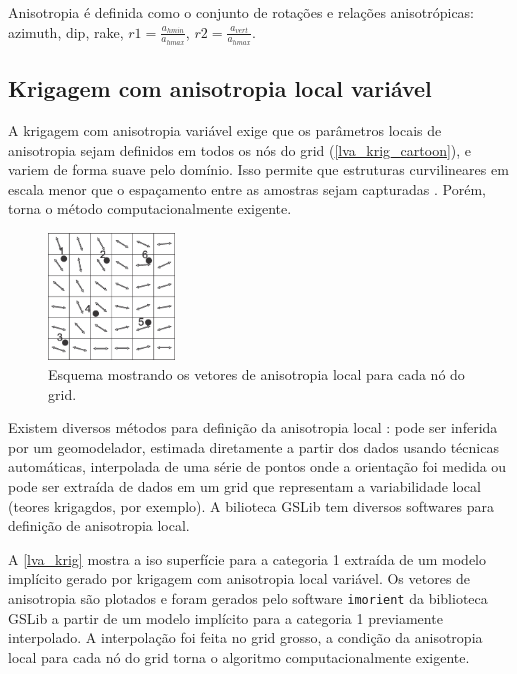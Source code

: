 Anisotropia é definida como o conjunto de rotações e relações anisotrópicas: azimuth, dip, rake, $r1 = \frac{a_{hmin}}{a_{hmax}}$, $r2 = \frac{a_{vert}}{a_{hmax}}$. 

\subsection{Krigagem com anisotropia local variável}

A krigagem com anisotropia variável exige que os parâmetros locais de anisotropia sejam definidos em todos os nós do grid (\autoref{lva_krig_cartoon}), e variem de forma suave pelo domínio. Isso permite que estruturas curvilineares em escala menor que o espaçamento entre as amostras sejam capturadas \cite{martin2017implicitmodeling}. Porém, torna o método computacionalmente exigente.

\begin{figure}[!ht]
\caption{\label{lva_krig_cartoon}Esquema mostrando os vetores de anisotropia local para cada nó do grid.}
	\begin{center}
		\includegraphics[width=0.3\textwidth]{capitulo_2/lvakrig.jpg}
	\end{center}
\end{figure}

Existem diversos métodos para definição da anisotropia local \cite{lillah2015inference}: pode ser inferida por um geomodelador, estimada diretamente a partir dos dados usando técnicas automáticas, interpolada de uma série de pontos onde a orientação foi medida ou pode ser extraída de dados em um grid que representam a variabilidade local (teores krigagdos, por exemplo). A bilioteca GSLib tem diversos softwares para definição de anisotropia local. 

A \autoref{lva_krig} mostra a iso superfície para a categoria 1 extraída de um modelo implícito gerado por krigagem com anisotropia local variável. Os vetores de anisotropia são plotados e foram gerados pelo software \verb|imorient| da biblioteca GSLib a partir de um modelo implícito para a categoria 1 previamente interpolado. A interpolação foi feita no grid grosso, a condição da anisotropia local para cada nó do grid torna o algoritmo computacionalmente exigente.

